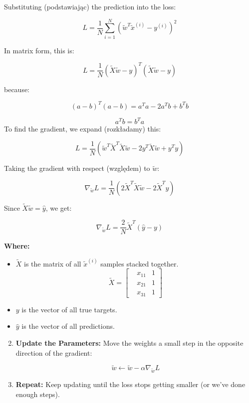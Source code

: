 \documentclass{article}
\begin{document}
Substituting (podstawiając) the prediction into the loss:

\[
L = \frac{1}{N} \sum_{i=1}^{N} \left( \tilde{w}^{T} \tilde{x}^{(i)} - y^{(i)} \right)^2
\]

In matrix form, this is:

\[
L = \frac{1}{N} (\tilde{X} \tilde{w} - y)^{T} (\tilde{X} \tilde{w} - y)
\]

\newpage
because:

\[
(a - b)^T (a - b) = a^T a - 2a^T b + b^T b
\]

\[
a^T b = b^T a
\]
To find the gradient, we expand (rozkładamy) this:

\[
L = \frac{1}{N} (\tilde{w}^{T} \tilde{X}^{T} \tilde{X} \tilde{w} - 2y^{T} \tilde{X} \tilde{w} + y^{T} y)
\]

Taking the gradient with respect (względem) to \( \tilde{w} \):

\[
\nabla_{\tilde{w}} L = \frac{1}{N} (2\tilde{X}^{T} \tilde{X} \tilde{w} - 2\tilde{X}^{T} y)
\]

Since \( \tilde{X} \tilde{w} = \hat{y} \), we get:

\[
\nabla_{\tilde{w}} L = \frac{2}{N} \tilde{X}^{T} (\hat{y} - y)
\]

\textbf{Where:}
\begin{itemize}
    \item \( \tilde{X} \) is the matrix of all \( \tilde{x}^{(i)} \) samples stacked together.
    \[
    \tilde{X} =
    \begin{bmatrix}
     & x_{11} & 1 \\
     & x_{21} & 1 \\
     & x_{31} & 1
    \end{bmatrix}
    \]
    \item \( y \) is the vector of all true targets.
    \item \( \hat{y} \) is the vector of all predictions.
\end{itemize}

\begin{enumerate}
    \setcounter{enumi}{1} %
    \item \textbf{Update the Parameters:} Move the weights a small step in the opposite direction of the gradient:
    
    \[
    \tilde{w} \leftarrow \tilde{w} - \alpha \nabla_{\tilde{w}} L
    \]

    \item \textbf{Repeat:} Keep updating until the loss stops getting smaller (or we've done enough steps).
\end{enumerate}
\newpage
\end{document}
